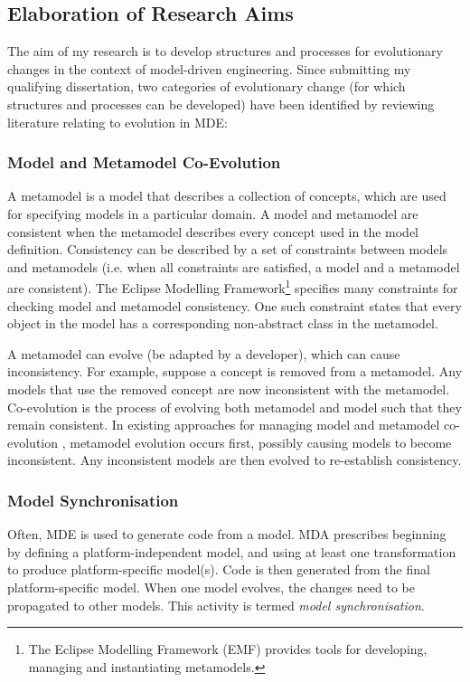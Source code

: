 \subsection{Elaboration of Research Aims}
\label{sub:elaboration}
The aim of my research is to develop structures and processes for evolutionary changes in the context of model-driven engineering. Since submitting my qualifying dissertation, two categories of evolutionary change (for which structures and processes can be developed) have been identified by reviewing literature relating to evolution in MDE:

\subsubsection{Model and Metamodel Co-Evolution} %
\label{ssub:model_and_metamodel_co_evolution}
A metamodel is a model that describes a collection of concepts, which are used for specifying models in a particular domain. A model and metamodel are consistent when the metamodel describes every concept used in the model definition. Consistency can be described by a set of constraints between models and metamodels (i.e. when all constraints are satisfied, a model and a metamodel are consistent). The Eclipse Modelling Framework\footnote{The Eclipse Modelling Framework (EMF) \cite{emf} provides tools for developing, managing and instantiating metamodels.} specifies many constraints for checking model and metamodel consistency. One such constraint states that every object in the model has a corresponding non-abstract class in the metamodel.

A metamodel can evolve (be adapted by a developer), which can cause inconsistency. For example, suppose a concept is removed from a metamodel. Any models that use the removed concept are now inconsistent with the metamodel. Co-evolution is the process of evolving both metamodel and model such that they remain consistent. In existing approaches for managing model and metamodel co-evolution \cite{herrmannsdoerfer08cope,cicchetti08automating}, metamodel evolution occurs first, possibly causing models to become inconsistent. Any inconsistent models are then evolved to re-establish consistency.


\subsubsection{Model Synchronisation} %
\label{ssub:model_synchronisation}
Often, MDE is used to generate code from a model. MDA prescribes beginning by defining a platform-independent model, and using at least one transformation to produce platform-specific model(s). Code is then generated from the final platform-specific model. When one model evolves, the changes need to be propagated to other models. This activity is termed \textit{model synchronisation}.


